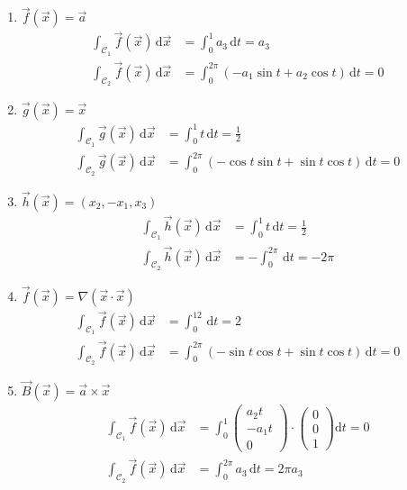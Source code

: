 \documentclass[11pt,answers]{exam}
\begin{document}
\begin{questions}
\begin{solution}
\begin{enumerate}
\item $\vec{f}(\vec{x})=\vec{a}$
\begin{align*}
\int_{\mathcal{C}_1}\vec{f}(\vec{x})\,\mathrm d\vec{x}
&=
\int_0^1a_3\,\mathrm dt=a_3
\\
\int_{\mathcal{C}_2}\vec{f}(\vec{x})\,\mathrm d\vec{x}
&=
\int_0^{2\pi}(-a_1\sin t+a_2\cos t)\,\mathrm dt=0
\end{align*}
\item $\vec{g}(\vec{x})=\vec{x}$
\begin{align*}
\int_{\mathcal{C}_1}\vec{g}(\vec{x})\,\mathrm d\vec{x}
&=
\int_0^1t\,\mathrm dt=\frac{1}{2}
\\
\int_{\mathcal{C}_2}\vec{g}(\vec{x})\,\mathrm d\vec{x}
&=
\int_0^{2\pi}(-\cos t\sin t+\sin t\cos t)\,\mathrm dt=0
\end{align*}
\item $\vec{h}(\vec{x})=(x_2,-x_1,x_3)$
\begin{align*}
\int_{\mathcal{C}_1}\vec{h}(\vec{x})\,\mathrm d\vec{x}
&=
\int_0^1t\,\mathrm dt=\frac{1}{2}
\\
\int_{\mathcal{C}_2}\vec{h}(\vec{x})\,\mathrm d\vec{x}
&=
-\int_0^{2\pi}\,\mathrm dt=-2\pi
\end{align*}
\item $\vec{f}(\vec{x})=\nabla(\vec{x}\cdot\vec{x})$
\begin{align*}
\int_{\mathcal{C}_1}\vec{f}(\vec{x})\,\mathrm d\vec{x}
&=
\int_0^12\,\mathrm dt=2
\\
\int_{\mathcal{C}_2}\vec{f}(\vec{x})\,\mathrm d\vec{x}
&=
\int_0^{2\pi}(-\sin t\cos t+\sin t\cos t)\,\mathrm dt=0
\end{align*}
\item $\vec{B}(\vec{x})=\vec{a}\times\vec{x}$
\begin{align*}
\int_{\mathcal{C}_1}\vec{f}(\vec{x})\,\mathrm d\vec{x}
&=
\int_0^1\begin{pmatrix}a_2t\\-a_1t\\0 \end{pmatrix}
\cdot
\begin{pmatrix} 0\\0\\1\end{pmatrix}
\mathrm dt=0
\\
\int_{\mathcal{C}_2}\vec{f}(\vec{x})\,\mathrm d\vec{x}
&=
\int_0^{2\pi}a_3\,\mathrm dt=2\pi a_3
\end{align*}

\end{enumerate}
\end{solution}
\end{questions}
\end{document}
